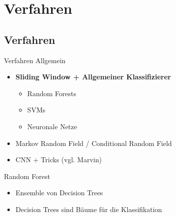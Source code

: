 \section{Verfahren}
\subsection{Verfahren}

\begin{frame}{Verfahren}
    Allgemein
    \begin{itemize}
        \item \textbf{Sliding Window + Allgemeiner Klassifizierer}
        \begin{itemize}
            \item Random Forests
            \item SVMs
            \item Neuronale Netze
        \end{itemize}
        \item Markov Random Field / Conditional Random Field
        \item CNN + Tricks (vgl. Marvin)
    \end{itemize}
\end{frame}

\begin{frame}{Random Forest}
    \begin{itemize}
        \item Ensemble von Decision Trees
        \item Decision Trees sind Bäume für die Klassifikation
    \end{itemize}
\end{frame}
